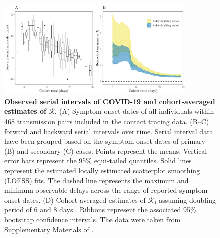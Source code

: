 \documentclass[12pt]{article}
\newcommand{\Rx}[1]{\ensuremath{{\mathcal R}_{#1}}\xspace}
\newcommand{\Ro}{\Rx{0}}
\newcommand{\RR}{\ensuremath{{\mathcal R}}\xspace}
\begin{document}
\begin{figure}[!th]
\begin{center}
\includegraphics[width=0.85\textwidth]{serial_analysis.pdf}
\caption{
\textbf{Observed serial intervals of COVID-19 and cohort-averaged estimates of \RR.}
(A) Symptom onset dates of all individuals within 468 transmission pairs included in the contact tracing data.
(B--C) forward and backward serial intervals over time.
Serial interval data have been grouped based on the symptom onset dates of primary (B) and secondary (C) cases.
Points represent the means. 
Vertical error bars represent the 95\% equi-tailed quantiles.
Solid lines represent the estimated locally estimated scatterplot smoothing (LOESS) fits.
The dashed line represents the maximum and minimum observable delays across the range of reported symptom onset dates.
(D) Cohort-averaged estimates of \Ro assuming doubling period of 6 and 8 days \citep{li2020early, wu2020nowcasting}.
Ribbons represent the associated 95\% bootstrap confidence intervals.
The data were taken from Supplementary Materials of \cite{du2020serial}.
}
\end{center}
\label{fig:du}
\end{figure}
\end{document}
